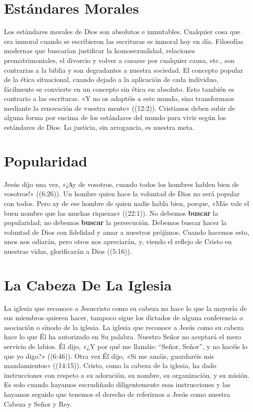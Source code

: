 \documentclass[12pt, twoside, openright]{book}
\begin{document}
\section{Estándares Morales}
Los estándares morales de Dios son absolutos e inmutables. Cualquier cosa que era inmoral cuando se escribieron las escrituras es inmoral hoy en día. Filosofías modernas que buscarían justificar la homosexualidad, relaciones prematrimoniales, el divorcio y volver a casarse por cualquier causa, etc., son contrarias a la biblia y son degradantes a nuestra sociedad. El concepto popular de la ética situacional, cuando dejado a la aplicación de cada individuo, fácilmente se convierte en un concepto sin ética en absoluto. Esto también es contrario a las escrituras. «Y no os adaptéis a este mundo, sino transformaos mediante la renovación de vuestra mente» ((12:2)). Cristianos deben subir de alguna forma por encima de los estándares del mundo para vivir según los estándares de Dios. La justicia, sin arrogancia, es nuestra meta.

\section{Popularidad}
Jesús dijo una vez, «¡Ay de vosotros, cuando todos los hombres hablen bien de vosotros!» ((6:26)). Un hombre quien hace la voluntad de Dios no será popular con todos. Pero ay de ese hombre de quien nadie habla bien, porque, «Más vale el buen nombre que las muchas riquezas» ((22:1)). No debemos \textbf{buscar} la popularidad; no debemos \textbf{buscar} la persecución. Debemos buscar hacer la voluntad de Dios con fidelidad y amar a nuestros prójimos. Cuando hacemos esto, unos nos odiarán, pero otros nos apreciarán, y, viendo el reflejo de Cristo en nuestras vidas, glorificarán a Dios ((5:16)).

\section{La Cabeza De La Iglesia}
La iglesia que reconoce a Jesucristo como su cabeza no hace lo que la mayoría de sus miembros quieren hacer, tampoco sigue los dictados de alguna conferencia o asociación o sínodo de la iglesia. La iglesia que reconoce a Jesús como su cabeza hace lo que Él ha autorizado en Su palabra. Nuestro Señor no aceptará el mero servicio de labios. Él dijo, «¿Y por qué me llamáis: “Señor, Señor”, y no hacéis lo que yo digo?» ((6:46)). Otra vez Él dijo, «Si me amáis, guardaréis mis mandamientos» ((14:15)). Cristo, como la cabeza de la iglesia, ha dado instrucciones con respeto a su adoración, su nombre, su organización, y su misión. Es solo cuando hayamos escrudiñado diligentemente esas instrucciones y las hayamos seguido que tenemos el derecho de referirnos a Jesús como nuestra Cabeza y Señor y Rey.
\end{document}

